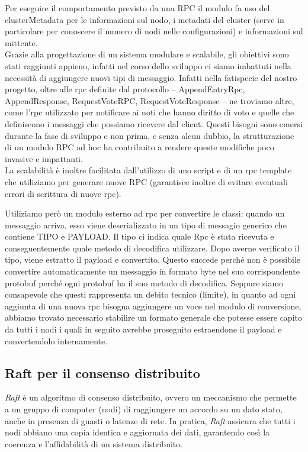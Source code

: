 Per eseguire il comportamento previsto da una RPC il modulo fa uso del clusterMetadata 
per le informazioni sul nodo, i metadati del cluster (serve in particolare per conoscere 
il numero di nodi nelle configurazioni) e informazioni sul mittente. \\
Grazie alla progettazione di un sistema modulare e scalabile, gli obiettivi sono stati raggiunti 
appieno, infatti nel corso dello sviluppo ci siamo imbattuti nella necessità di aggiungere nuovi 
tipi di messaggio. Infatti nella fatispecie del nostro progetto, oltre alle rpc definite dal protocollo 
-- AppendEntryRpc, AppendResponse, RequestVoteRPC, RequestVoteResponse -- ne troviamo altre, 
come l'rpc utilizzato per notificare ai noti che hanno diritto di voto e quelle che definiscono 
i messaggi che possiamo ricevere dal client. Questi bisogni sono emersi durante la fase di 
sviluppo e non prima, e senza alcun dubbio, la strutturazione di un modulo RPC ad hoc 
ha contribuito a rendere queste modifiche poco invasive e impattanti. \\
La scalabilità è inoltre facilitata dall'utilizzo di uno script e di un rpc template 
che utiliziamo per generare nuove RPC (garantisce inoltre di evitare eventuali errori di 
scrittura di nuove rpc). 

Utiliziamo però un modulo esterno ad rpc per convertire le classi: quando un messaggio 
arriva, esso viene deserializzato in un tipo di messagio generico che contiene TIPO e PAYLOAD. 
Il tipo ci indica quale Rpc è stata ricevuta e conseguentemente quale metodo di decodifica utilizzare. 
Dopo averne verificato il tipo, viene estratto il payload e convertito. 
Questo succede perché non è possibile convertire automaticamente un messaggio in formato byte nel suo 
corrispondente protobuf perché ogni protobuf ha il suo metodo di decodifica. Seppure siamo 
consapevole che questi rappresenta un debito tecnico (limite), in quanto ad ogni aggiunta di 
una nuova rpc bisogna aggiungere un voce nel modulo di conversione, abbiamo trovato 
necessario stabilire un formato generale che potesse essere capito da tutti i nodi i quali 
in seguito avrebbe proseguito estraendone il payload e convertendolo internamente.


\subsection{Raft per il consenso distribuito}
\textit{Raft} è un algoritmo di consenso distribuito, ovvero un meccanismo che permette 
a un gruppo di computer (nodi) di raggiungere un accordo su un dato stato, 
anche in presenza di guasti o latenze di rete. In pratica, 
\textit{Raft} assicura che tutti i nodi abbiano una copia identica e 
aggiornata dei dati, garantendo così la coerenza e l'affidabilità di un sistema distribuito.

